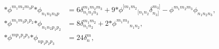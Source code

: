 \begin{equation}
\begin{aligned}
   {*\phi}^{m_1m_2m_3p} {*\phi}_{n_1n_2n_3p}
      &= 6\delta^{m_1m_2m_3}_{n_1n_2n_3} 
        + 9 {*\phi}^{[m_1m_2}{}_{[n_1n_2}\delta^{m_3]}_{n_3]}
        - \phi^{m_1m_2m_3}\phi_{n_1n_2n_3} , \\
   {*\phi}^{m_1m_2p_1p_2} {*\phi}_{n_1n_2p_1p_2}
      &= 8\delta^{m_1m_2}_{n_1n_2} 
         + 2 {*\phi}^{m_1m_2}{}_{n_1n_2} , \\
   {*\phi}^{mp_1p_2p_3} {*\phi}_{np_1p_2p_3} &= 24\delta^{m}_{n},
\end{aligned}
\end{equation}

